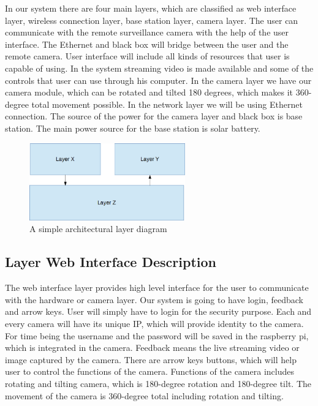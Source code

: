 In our system there are four main layers, which are classified as web interface layer, wireless connection layer, base station layer, camera layer. The user can communicate with the remote surveillance camera with the help of the user interface. The Ethernet and black box will bridge between the user and the remote camera. User interface will include all kinds of resources that user is capable of using. In the system streaming video is made available and some of the controls that user can use through his computer. In the camera layer we have our camera module, which can be rotated and tilted 180 degrees, which makes it 360- degree total movement possible. In the network layer we will be using Ethernet connection. The source of the power for the camera layer and black box is base station. The main power source for the base station is solar battery.


\begin{figure}[h!]
	\centering
 	\includegraphics[width=0.60\textwidth]{images/layers}
 \caption{A simple architectural layer diagram}
\end{figure}

\subsection{Layer Web Interface Description}
The web interface layer provides high level interface for the user to communicate with the hardware or camera layer. Our system is going to have login, feedback and arrow keys. User will simply have to login for the security purpose. Each and every camera will have its unique IP, which will provide identity to the camera. For time being the username and the password will be saved in the raspberry pi, which is integrated in the camera. Feedback means the live streaming video or image captured by the camera. There are arrow keys buttons, which will help user to control the functions of the camera. Functions of the camera includes rotating and tilting camera, which is 180-degree rotation and 180-degree tilt. The movement of the camera is 360-degree total including rotation and tilting.


